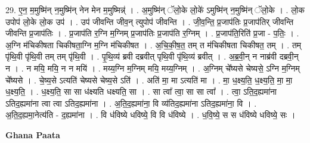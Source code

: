 \documentclass[17pt]{extarticle}
\begin{document}
29. ए॒न॒ म॒मुष्मि॑न् न॒मुष्मि॑न् नेन मेन म॒मुष्मिन्न्॑ । . अ॒मुष्मि॑न् ॅलो॒के लो॒के॑ ऽमुष्मि॑न् न॒मुष्मि॑न् ॅलो॒के । . लो॒क उपोप॑ लो॒के लो॒क उप॑ । . उप॑ जीवन्ति जीव॒न् त्युपोप॑ जीवन्ति । . जी॒व॒न्ति॒ प्र॒जाप॑तिः प्र॒जाप॑तिर् जीवन्ति जीवन्ति प्र॒जाप॑तिः । . प्र॒जाप॑ति र॒ग्नि म॒ग्निम् प्र॒जाप॑तिः प्र॒जाप॑ति र॒ग्निम् । . प्र॒जाप॑ति॒रिति॑ प्र॒जा - प॒तिः॒ । . अ॒ग्नि म॑चिकीषता चिकीषता॒ग्नि म॒ग्नि म॑चिकीषत । . अ॒चि॒की॒ष॒त॒ तम् त म॑चिकीषता चिकीषत॒ तम् । . तम् पृ॑थि॒वी पृ॑थि॒वी तम् तम् पृ॑थि॒वी । . पृ॒थि॒व्य॑ ब्रवी दब्रवीत् पृथि॒वी पृ॑थि॒व्य॑ ब्रवीत् । . अ॒ब्र॒वी॒न् न नाब्र॑वी दब्रवी॒न् न । . न मयि॒ मयि॒ न न मयि॑ । . मय्य॒ग्नि म॒ग्निम् मयि॒ मय्य॒ग्निम् । . अ॒ग्निम् चे᳚ष्यसे चेष्यसे॒ ऽग्नि म॒ग्निम् चे᳚ष्यसे । . चे॒ष्य॒से ऽत्यति॑ चेष्यसे चेष्य॒से ऽति॑ । . अति॑ मा॒ मा ऽत्यति॑ मा । . मा॒ ध॒क्ष्य॒ति॒ ध॒क्ष्य॒ति॒ मा॒ मा॒ ध॒क्ष्य॒ति॒ । . ध॒क्ष्य॒ति॒ सा सा ध॑क्ष्यति धक्ष्यति॒ सा । . सा त्वा᳚ त्वा॒ सा सा त्वा᳚ । . त्वा॒ ऽति॒द॒ह्यमा॑ना ऽतिद॒ह्यमा॑ना त्वा त्वा ऽतिद॒ह्यमा॑ना । . अ॒ति॒द॒ह्यमा॑ना॒ वि व्य॑तिद॒ह्यमा॑ना ऽतिद॒ह्यमा॑ना॒ वि । . अ॒ति॒द॒ह्यमा॒नेत्य॑ति - द॒ह्यमा॑ना । . वि ध॑विष्ये धविष्ये॒ वि वि ध॑विष्ये । . ध॒वि॒ष्ये॒ स स ध॑विष्ये धविष्ये॒ सः । \newline

\textbf{Ghana Paata } \newline
\end{document}
